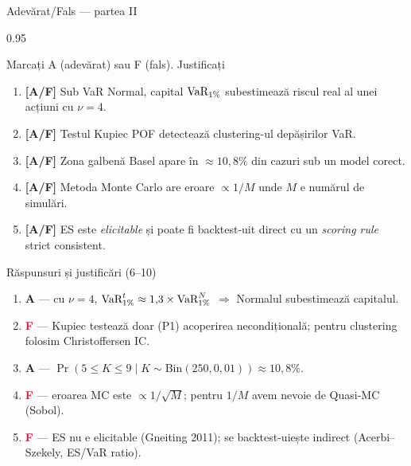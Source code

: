 \documentclass[9pt, aspectratio=169, t]{beamer}
\begin{document}
\begin{frame}[shrink=10]{Adevărat/Fals --- partea II}
\begin{cminipage}{0.95\textwidth}
\begin{block}{Marcați A (adevărat) sau F (fals). Justificați}
\begin{enumerate}\setlength{\itemsep}{1pt}\setcounter{enumi}{5}
    \item \textbf{[A/F]} Sub VaR Normal, capital $\text{VaR}_{1\%}$ subestimează riscul real al unei acțiuni cu $\nu = 4$.
    \item \textbf{[A/F]} Testul Kupiec POF detectează clustering-ul depășirilor VaR.
    \item \textbf{[A/F]} Zona galbenă Basel apare în $\approx 10{,}8\%$ din cazuri sub un model corect.
    \item \textbf{[A/F]} Metoda Monte Carlo are eroare $\propto 1/M$ unde $M$ e numărul de simulări.
    \item \textbf{[A/F]} ES este \textit{elicitable} și poate fi backtest-uit direct cu un \textit{scoring rule} strict consistent.
\end{enumerate}
\end{block}
\vspace{0.15cm}
\begin{exampleblock}{Răspunsuri și justificări (6--10)}
\begin{enumerate}\setlength{\itemsep}{0pt}\setcounter{enumi}{5}
    \item \textcolor{Forest}{\textbf{A}} --- cu $\nu = 4$, $\text{VaR}^{t}_{1\%} \approx 1{,}3 \times \text{VaR}^{N}_{1\%}$ $\Rightarrow$ Normalul subestimează capitalul.
    \item \textcolor{Crimson}{\textbf{F}} --- Kupiec testează doar (P1) acoperirea necondițională; pentru clustering folosim Christoffersen IC.
    \item \textcolor{Forest}{\textbf{A}} --- $\Pr(5 \leq K \leq 9 \mid K \sim \text{Bin}(250, 0{,}01)) \approx 10{,}8\%$.
    \item \textcolor{Crimson}{\textbf{F}} --- eroarea MC este $\propto 1/\sqrt{M}$; pentru $1/M$ avem nevoie de Quasi-MC (Sobol).
    \item \textcolor{Crimson}{\textbf{F}} --- ES nu e elicitable (Gneiting 2011); se backtest-uiește indirect (Acerbi--Szekely, ES/VaR ratio).
\end{enumerate}
\end{exampleblock}
\end{cminipage}
\end{frame}
\end{document}
